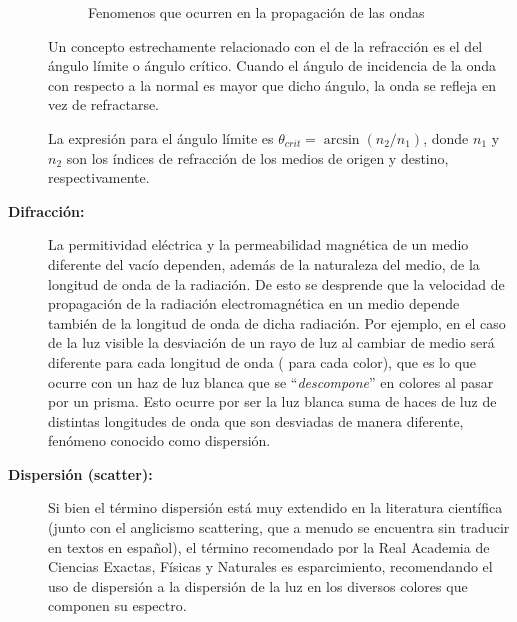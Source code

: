 \begin{description}
\begin{figure}[!h]
  \caption{Fenomenos que ocurren en la propagaci\'on de las ondas}
\end{figure}

Un concepto estrechamente relacionado con el de la refracci\'on es el
del \'angulo l\'imite o \'angulo cr\'itico. Cuando el \'angulo de
incidencia de la onda con respecto a la normal es mayor que dicho
\'angulo, la onda se refleja en vez de refractarse.

La expresi\'on para el \'angulo l\'imite es  $ \theta_{crit} =
\arcsin(n_2/n_1) $, donde $n_1$ y $n_2$ son los \'indices de
refracci\'on de los medios de origen y destino, respectivamente.

\item[\bf Difracci\'on:]

  La permitividad eléctrica y la permeabilidad magnética de un medio diferente del vacío dependen, además de la naturaleza del medio, de la longitud de onda de la radiación. De esto se desprende que la velocidad de propagación de la radiación electromagnética en un medio depende también de la longitud de onda de dicha radiación. Por ejemplo, en el caso de la luz visible la desviación de un rayo de luz al cambiar de medio será diferente para cada longitud de onda ( para cada color), que es lo que ocurre con  un haz de luz blanca que se ``\emph{descompone}'' en colores al pasar por un prisma. Esto ocurre por ser la luz blanca  suma de haces de luz de distintas longitudes de onda que son desviadas de manera diferente, fenómeno conocido como dispersión.


  

\item[\bf Dispersi\'on (scatter):] 
  Si bien el término dispersión está muy extendido en la literatura científica (junto con el anglicismo scattering, que a menudo se encuentra sin traducir en textos en español), el término recomendado por la Real Academia de Ciencias Exactas, Físicas y Naturales es esparcimiento, recomendando el uso de dispersión a la dispersión de la luz en los diversos colores que componen su espectro.


\end{description}
